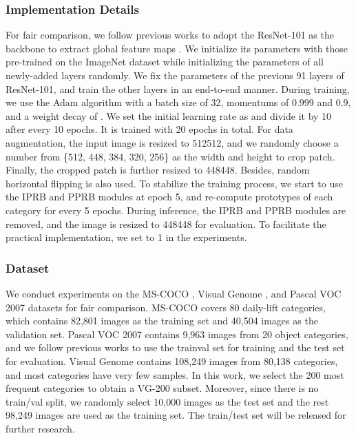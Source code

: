 \documentclass[lettersize,journal]{IEEEtran}
\begin{document}
\subsubsection{Implementation Details} 
For fair comparison, we follow previous works \cite{Chen2019SSGRL, Durand2019CVPR} to adopt the ResNet-101 \cite{He2016ResNet} as the backbone to extract global feature maps . We initialize its parameters with those pre-trained on the ImageNet \cite{Deng2009Imagenet} dataset while initializing the parameters of all newly-added layers randomly. We fix the parameters of the previous 91 layers of ResNet-101, and train the other layers in an end-to-end manner. During training, we use the Adam algorithm \cite{Kingma2015Adam} with a batch size of 32, momentums of 0.999 and 0.9, and a weight decay of . We set the initial learning rate as  and divide it by 10 after every 10 epochs. It is trained with 20 epochs in total. For data augmentation, the input image is resized to 512512, and we randomly choose a number from \{512, 448, 384, 320, 256\} as the width and height to crop patch. Finally, the cropped patch is further resized to 448448. Besides, random horizontal flipping is also used. To stabilize the training process, we start to use the IPRB and PPRB modules at epoch 5, and re-compute prototypes of each category for every 5 epochs. During inference, the IPRB and PPRB modules are removed, and the image is resized to 448448 for evaluation. To facilitate the practical implementation, we set  to 1 in the experiments. 

\subsubsection{Dataset} We conduct experiments on the MS-COCO \cite{Lin2014COCO}, Visual Genome \cite{Krishna2017VG}, and Pascal VOC 2007 \cite{Everingham2010Pascal} datasets for fair comparison. MS-COCO covers 80 daily-lift categories, which contains 82,801 images as the training set and 40,504 images as the validation set. Pascal VOC 2007 contains 9,963 images from 20 object categories, and we follow previous works to use the trainval set for training and the test set for evaluation. Visual Genome contains 108,249 images from 80,138 categories, and most categories have very few samples. In this work, we select the 200 most frequent categories to obtain a VG-200 subset. Moreover, since there is no train/val split, we randomly select 10,000 images as the test set and the rest 98,249 images are used as the training set. The train/test set will be released for further research.
\end{document}
